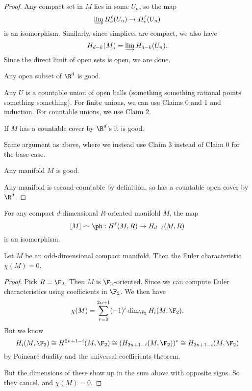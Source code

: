 \documentclass[a4paper]{article}
\begin{document}
\begin{proof}
  Any compact set in $M$ lies in some $U_n$, so the map
  \[
    \varinjlim H_c^\ell (U_n) \to H_c^\ell(U_n)
  \]
  is an isomorphism. Similarly, since simplices are compact, we also have
  \[
    H_{d - k}(M) = \varinjlim H_{d - k}(U_n).
  \]
  Since the direct limit of open sets is open, we are done.

  \begin{cclaim}
    Any open subset of $\R^d$ is good.
  \end{cclaim}
  Any $U$ is a countable union of open balls (something something rational points something something). For finite unions, we can use Claims 0 and 1 and induction. For countable unions, we use Claim 2.

  \begin{cclaim}
    If $M$ has a countable cover by $\R^d$'s it is good.
  \end{cclaim}
  Same argument as above, where we instead use Claim 3 instead of Claim 0 for the base case.

  \begin{cclaim}
    Any manifold $M$ is good.
  \end{cclaim}
  Any manifold is second-countable by definition, so has a countable open cover by $\R^d$.
\end{proof}

\begin{cor}
  For any compact $d$-dimensional $R$-oriented manifold $M$, the map
  \[
    [M] \frown \ph: H^\ell(M, R) \to H_{d - \ell}(M, R)
  \]
  is an isomorphism.
\end{cor}

\begin{cor}
  Let $M$ be an odd-dimensional compact manifold. Then the Euler characteristic $\chi(M) = 0$.
\end{cor}

\begin{proof}
  Pick $R = \F_2$. Then $M$ is $\F_2$-oriented. Since we can compute Euler characteristics using coefficients in $\F_2$. We then have
  \[
    \chi(M) = \sum_{r = 0}^{2n + 1} (-1)^i \dim_{\F_2} H_i(M, \F_2).
  \]
  But we know
  \[
    H_i(M, \F_2) \cong H^{2n + 1 - i}(M, \F_2) \cong (H_{2n + 1 - i}(M, \F_2))^* \cong H_{2n + 1 - i}(M, \F_2)
  \]
  by Poincar\'e duality and the universal coefficients theorem.

  But the dimensions of these show up in the sum above with opposite signs. So they cancel, and $\chi(M) = 0$.
\end{proof}
\end{document}
